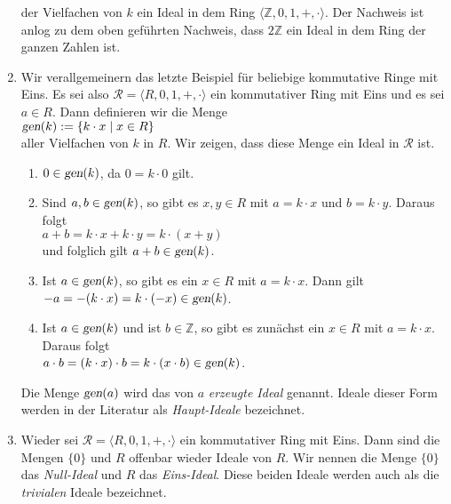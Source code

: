 \begin{enumerate}
      der Vielfachen von $k$  ein Ideal in dem Ring $\langle \mathbb{Z}, 0, 1, +, \cdot \rangle$.
      Der Nachweis ist anlog zu dem oben gef\"{u}hrten Nachweis, dass $2\mathbb{Z}$ ein Ideal
      in dem Ring der ganzen Zahlen ist.
\item Wir verallgemeinern das letzte Beispiel f\"{u}r beliebige kommutative Ringe mit Eins.
      Es sei also $\mathcal{R} = \langle R, 0, 1, +, \cdot \rangle$ ein kommutativer Ring
      mit Eins und es sei $a \in R$.  Dann definieren wir die Menge
      \\
      \hspace*{1.3cm}
      $\textsl{gen}(k) := \{ k \cdot x \mid x \in R \}$
      \\[0.2cm]
      aller Vielfachen von $k$ in $R$.  Wir zeigen, dass diese Menge ein Ideal in
      $\mathcal{R}$ ist.
      \begin{enumerate}
      \item $0 \in \textsl{gen}(k)$, da $0 = k \cdot 0$ gilt. 
      \item Sind $a, b \in \textsl{gen}(k)$, so gibt es $x,y \in R$ mit $a = k \cdot x$ und 
            $b = k \cdot y$.  Daraus folgt
            \\[0.2cm]
            \hspace*{1.3cm}
            $a + b = k \cdot x + k \cdot y = k \cdot (x + y)$
            \\[0.2cm]
            und folglich gilt $a+b \in \textsl{gen}(k)$.
      \item Ist $a \in \textsl{gen}(k)$, so gibt es ein $x \in R$ mit $a = k \cdot x$.  Dann gilt
            \\[0.2cm]
            \hspace*{1.3cm}
            $-a = - (k \cdot x) = k \cdot (-x) \in \textsl{gen}(k)$.
      \item Ist $a \in \textsl{gen}(k)$ und ist $b \in \mathbb{Z}$, so gibt es zun\"{a}chst ein
            $x \in R$ mit $a = k \cdot x$.  Daraus folgt
            \\[0.2cm]
            \hspace*{1.3cm}
            $a \cdot b = (k \cdot x) \cdot b = k \cdot (x \cdot b) \in \textsl{gen}(k)$.
      \end{enumerate}
      Die Menge $\textsl{gen}(a)$ wird das von $a$ {\color{blue}\emph{erzeugte Ideal}} genannt.
      Ideale dieser Form werden in der Literatur als {\color{blue}\emph{Haupt-Ideale}} bezeichnet.
\item Wieder sei $\mathcal{R} = \langle R, 0, 1, +, \cdot \rangle$ ein kommutativer Ring mit Eins.  Dann
      sind die Mengen $\{0\}$ und $R$ offenbar wieder Ideale von $R$.  Wir nennen  die Menge $\{0\}$
      das {\color{blue}\emph{Null-Ideal}} und $R$ das {\color{blue}\emph{Eins-Ideal}}.  Diese
      beiden Ideale werden auch als die \emph{trivialen} Ideale bezeichnet.
      \eox
\end{enumerate}


